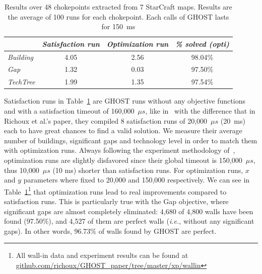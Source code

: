 \documentclass[journal]{IEEEtran}
\newcommand{\ghost}{\textsc{GHOST}\xspace}
\newcommand{\ie}{\textit{i.e.}}
\begin{document}
\begin{table}[ht]
  \caption{Results  over 48  chokepoints  extracted  from 7  StarCraft
    maps. Results  are the  average of 100  runs for  each chokepoint.
    Each calls of \ghost lasts for 150~ms}
    \label{tab:wall}
    \centering
    \begin{tabular}{|l|c|c|c|}
      \cline{2-4}
      \multicolumn{1}{c|}{}   &    {\em   Satisfaction    run}&   {\em
        Optimization run}& {\em \% solved (opti)} \\
      \hline
      {\em Building} & 4.05 & 2.56 & 98.04\% \\
      {\em Gap} & 1.32 & 0.03 & 97.50\% \\
      {\em TechTree} & 1.99 & 1.35 & 97.54\% \\
      \hline
    \end{tabular}
\end{table}
Satisfaction runs in Table~\ref{tab:wall}  are \ghost runs without any
objective functions  and with  a satisfaction  timeout of  160,000~$\mu s$, like
in~\cite{RichouxUO14}  with the  difference that  in Richoux  et al.'s
paper, they  compiled 8 satisfaction runs  of 20,000~$\mu s$ (20~ms) each to  have great
chances to find  a valid solution. We measure their  average number of
buildings, significant  gaps and  technology level  in order  to match
them  with   optimization  runs.   Always  following   the  experiment
methodology  of~\cite{RichouxUO14},  optimization  runs  are  slightly
disfavored since their global timeout is 150,000~$\mu s$, thus 10,000~$\mu s$ (10 ms) shorter than satisfaction
runs. For optimization  runs, $x$ and $y$ parameters where
fixed   to    20,000   and   150,000    respectively.    We   can    see   in
Table~\ref{tab:wall}\footnote{All wall-in data  and experiment results
  can                   be                  found                   at
  \href{https://github.com/richoux/GHOST\_paper/tree/master/xp/wallin}{github.com/richoux/GHOST\_paper/tree/master/xp/wallin}}
that  optimization  runs  lead   to  real  improvements  compared  to
satisfaction runs. This  is particularly true with  the Gap objective,
where significant  gaps are  almost completely eliminated:
 4,680 of 4,800 walls have been found (97.50\%), and 4,527 of them
are perfect walls (\ie, without any significant gaps). In other words,
96.73\% of walls found by \ghost are perfect.
\end{document}
